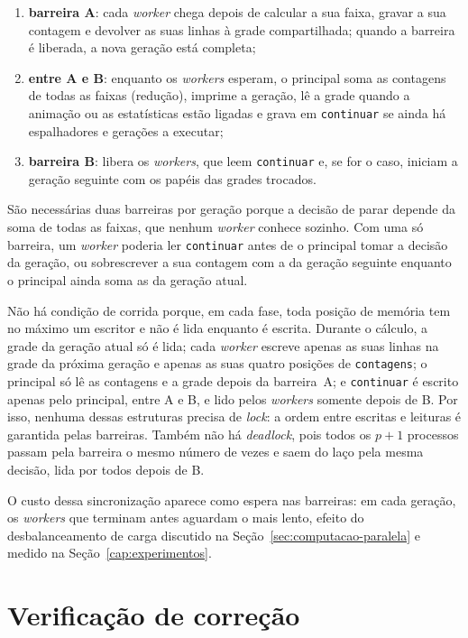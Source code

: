 \begin{enumerate}
    \item \textbf{barreira A}: cada \textit{worker} chega depois de calcular a sua faixa, gravar a sua contagem e devolver as suas linhas à grade compartilhada; quando a barreira é liberada, a nova geração está completa;
    \item \textbf{entre A e B}: enquanto os \textit{workers} esperam, o principal soma as contagens de todas as faixas (redução), imprime a geração, lê a grade quando a animação ou as estatísticas estão ligadas e grava em \texttt{continuar} se ainda há espalhadores e gerações a executar;
    \item \textbf{barreira B}: libera os \textit{workers}, que leem \texttt{continuar} e, se for o caso, iniciam a geração seguinte com os papéis das grades trocados.
\end{enumerate}

São necessárias duas barreiras por geração porque a decisão de parar depende da soma de todas as faixas, que nenhum \textit{worker} conhece sozinho. Com uma só barreira, um \textit{worker} poderia ler \texttt{continuar} antes de o principal tomar a decisão da geração, ou sobrescrever a sua contagem com a da geração seguinte enquanto o principal ainda soma as da geração atual.

Não há condição de corrida porque, em cada fase, toda posição de memória tem no máximo um escritor e não é lida enquanto é escrita. Durante o cálculo, a grade da geração atual só é lida; cada \textit{worker} escreve apenas as suas linhas na grade da próxima geração e apenas as suas quatro posições de \texttt{contagens}; o principal só lê as contagens e a grade depois da barreira~A; e \texttt{continuar} é escrito apenas pelo principal, entre A e B, e lido pelos \textit{workers} somente depois de B. Por isso, nenhuma dessas estruturas precisa de \textit{lock}: a ordem entre escritas e leituras é garantida pelas barreiras. Também não há \textit{deadlock}, pois todos os $p+1$ processos passam pela barreira o mesmo número de vezes e saem do laço pela mesma decisão, lida por todos depois de B.

O custo dessa sincronização aparece como espera nas barreiras: em cada geração, os \textit{workers} que terminam antes aguardam o mais lento, efeito do desbalanceamento de carga discutido na Seção~\ref{sec:computacao-paralela} e medido na Seção~\ref{cap:experimentos}.

\section{Verificação de correção}\label{sec:verificacao-paralela}

